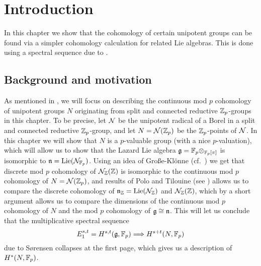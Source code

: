 \section{Introduction}%
\label{sec:cohunigps-intro}

In this chapter we show that the cohomology of certain unipotent groups can be found via a simpler cohomology calculation for related Lie algebras. This is done using a spectral sequence due to \cite{Sor}.

\subsection{Background and motivation}


As mentioned in , we will focus on describing the continuous mod $p$ cohomology of unipotent groups $N$ originating from split and connected reductive $\mathbb{Z}_p$-groups in this chapter. To be precise, let $\mathcal{N}$ be the unipotent radical of a Borel in a split and connected reductive $\mathbb{Z}_{p}$-group, and let $N = \mathcal{N}(\mathbb{Z}_{p})$ be the $\mathbb{Z}_{p}$-points of $\mathcal{N}$. In this chapter we will show that $N$ is a $p$-valuable group (with a nice $p$-valuation), which will allow us to show that the Lazard Lie algebra $\mathfrak{g} = \mathbb{F}_{p} \otimes_{\mathbb{F}_{p}[\pi]}$ is isomorphic to $\mathfrak{n} = \operatorname{Lie}(\mathcal{N}_{\mathbb{F}_{p}})$. Using an idea of Große-Klönne (cf.\ \cite[Sect.~7]{GK}) we get that discrete mod $p$ cohomology of $\mathcal{N}_{\mathbb{Z}}(\mathbb{Z})$ is isomorphic to the continuous mod $p$ cohomology of $N = \mathcal{N}(\mathbb{Z}_{p})$, and results of Polo and Tilouine (see \cite{PT}) allows us to compare the discrete cohomology of $\mathfrak{n}_{\mathbb{Z}} = \operatorname{Lie}(\mathcal{N}_{\mathbb{Z}})$ and $\mathcal{N}_{\mathbb{Z}}(\mathbb{Z})$, which by a short argument allows us to compare the dimensions of the continuous mod $p$ cohomology of $N$ and the mod $p$ cohomology of $\mathfrak{g} \cong \mathfrak{n}$. This will let us conclude that the multiplicative spectral sequence \[ E_{1}^{s,t} = H^{s,t}(\mathfrak{g},\mathbb{F}_{p}) \Longrightarrow H^{s+t}(N,\mathbb{F}_{p}) \] due to Sørensen collapses at the first page, which gives us a description of $H^{*}(N,\mathbb{F}_{p})$.

